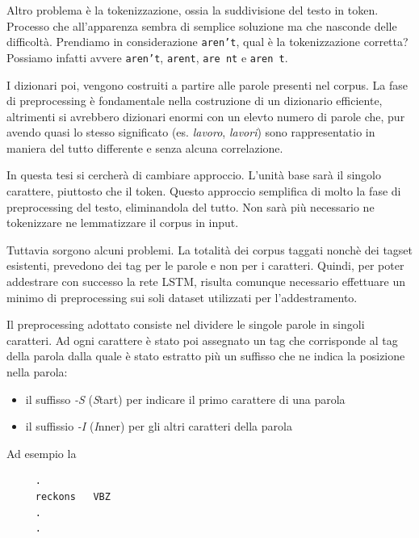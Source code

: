 Altro problema \`e la tokenizzazione, ossia la suddivisione del testo in token. Processo che all'apparenza sembra di semplice soluzione ma che nasconde delle difficolt\`a.
Prendiamo in considerazione \texttt{aren't}, qual \`e la tokenizzazione corretta? Possiamo infatti avvere \texttt{aren't}, \texttt{arent}, \texttt{are nt} e \texttt{aren t}.

I dizionari poi, vengono costruiti a partire alle parole presenti nel corpus.
La fase di preprocessing \`e fondamentale nella costruzione di un dizionario efficiente, altrimenti si avrebbero dizionari enormi con un elevto numero di parole che, pur avendo quasi lo stesso significato (es. \emph{lavoro}, \emph{lavori}) sono rappresentatio in maniera del tutto differente e senza alcuna correlazione.

In questa tesi si cercher\`a di cambiare approccio. L'unit\`a base sar\`a il singolo carattere, piuttosto che il token.
Questo approccio semplifica di molto la fase di preprocessing del testo, eliminandola del tutto.
Non sar\`a pi\`u necessario ne tokenizzare ne lemmatizzare il corpus in input.

Tuttavia sorgono alcuni problemi. La totalit\`a dei corpus taggati nonch\`e dei tagset esistenti, prevedono dei tag per le parole e non per i caratteri.
Quindi, per poter addestrare con successo la rete LSTM, risulta comunque necessario effettuare un minimo di preprocessing sui soli dataset utilizzati per l'addestramento.

Il preprocessing adottato consiste nel dividere le singole parole in singoli caratteri.
Ad ogni carattere \`e stato poi assegnato un tag che corrisponde al tag della parola dalla quale \`e stato estratto pi\`u un suffisso che ne indica la posizione nella parola:

\begin{itemize}
  \item il suffisso \emph{-S} (\emph{S}tart) per indicare il primo carattere di una parola
  \item il suffissio \emph{-I} (\emph{I}nner) per gli altri caratteri della parola
\end{itemize}

Ad esempio la

\begin{center}
  \begin{minipage}{5cm}
    \begin{verbatim}
     .
     reckons   VBZ
     .
     .
    \end{verbatim}
  \end{minipage}
\end{center}


